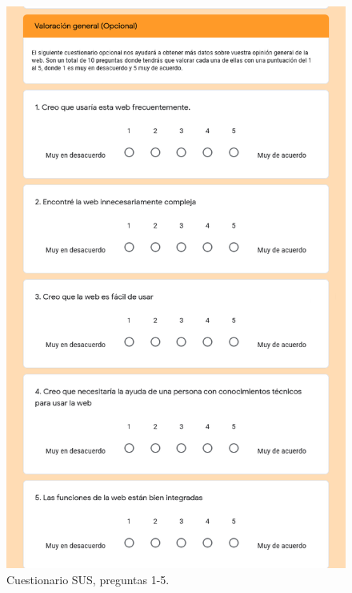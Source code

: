 \begin{figure}[h!]
	\centering
	\includegraphics[width=\linewidth]{Imagenes/Bitmap/Valoracion_general_sus1}
	\caption{Cuestionario SUS, preguntas 1-5.}
	\label{fig:valoraciongeneralsus1}
\end{figure}

